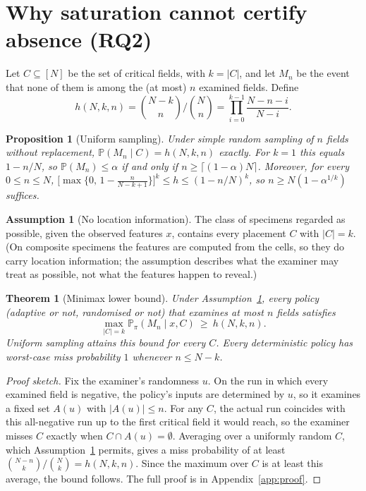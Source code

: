 \documentclass[11pt]{article}
\newtheorem{proposition}{Proposition}
\newtheorem{theorem}{Theorem}
\theoremstyle{remark}
\theoremstyle{definition}
\newtheorem{assumption}{Assumption}
\newcommand{\Prb}{\mathbb{P}}
\begin{document}
\section{Why saturation cannot certify absence (RQ2)}\label{sec:theory}
Let $C\subseteq[N]$ be the set of critical fields, with $k=|C|$, and let $M_n$ be the event that none of them is among the (at most) $n$ examined fields. Define
\[
h(N,k,n)=\binom{N-k}{n}\Big/\binom{N}{n}=\prod_{i=0}^{k-1}\frac{N-n-i}{N-i}.
\]

\begin{proposition}[Uniform sampling]\label{prop:uniform}
Under simple random sampling of $n$ fields without replacement, $\Prb(M_n\mid C)=h(N,k,n)$ exactly. For $k=1$ this equals $1-n/N$, so $\Prb(M_n)\le\alpha$ if and only if $n\ge\lceil(1-\alpha)N\rceil$. Moreover, for every $0\le n\le N$, $\big[\max\{0,\,1-\tfrac{n}{N-k+1}\}\big]^k\le h\le(1-n/N)^k$, so $n\ge N(1-\alpha^{1/k})$ suffices.
\end{proposition}

\begin{assumption}[No location information]\label{ass:A}
The class of specimens regarded as possible, given the observed features $x$, contains every placement $C$ with $|C|=k$. (On composite specimens the features are computed from the cells, so they do carry location information; the assumption describes what the examiner may treat as possible, not what the features happen to reveal.)
\end{assumption}

\begin{theorem}[Minimax lower bound]\label{thm:minimax}
Under Assumption~\ref{ass:A}, every policy (adaptive or not, randomised or not) that examines at most $n$ fields satisfies
\[
\max_{|C|=k}\Prb_\pi(M_n\mid x,C)\ \ge\ h(N,k,n).
\]
Uniform sampling attains this bound for every $C$. Every deterministic policy has worst-case miss probability $1$ whenever $n\le N-k$.
\end{theorem}
\begin{proof}[Proof sketch]
Fix the examiner's randomness $u$. On the run in which every examined field is negative, the policy's inputs are determined by $u$, so it examines a fixed set $A(u)$ with $|A(u)|\le n$. For any $C$, the actual run coincides with this all-negative run up to the first critical field it would reach, so the examiner misses $C$ exactly when $C\cap A(u)=\emptyset$. Averaging over a uniformly random $C$, which Assumption~\ref{ass:A} permits, gives a miss probability of at least $\binom{N-n}{k}/\binom{N}{k}=h(N,k,n)$. Since the maximum over $C$ is at least this average, the bound follows. The full proof is in Appendix~\ref{app:proof}.
\end{proof}
\end{document}
